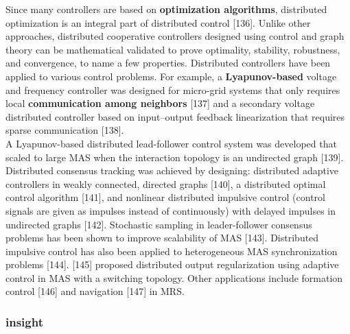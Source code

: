 \documentclass{article}
\begin{document}
				Since many controllers are based on \textbf{optimization algorithms}, distributed optimization is an integral part of distributed control \citet{rizk-2018-decision-making-in-multiagent-systems-a-survey}[136]. Unlike other approaches, distributed cooperative controllers designed using control and graph theory can be mathematical validated to prove optimality, stability, robustness, and convergence, to name a few properties. Distributed controllers have been applied to various control problems. For example, a \textbf{Lyapunov-based} voltage and frequency controller was designed for micro-grid systems that only  requires local \textbf{communication among neighbors} \citet{rizk-2018-decision-making-in-multiagent-systems-a-survey}[137] and a secondary voltage distributed controller based on input–output feedback linearization that requires sparse communication \citet{rizk-2018-decision-making-in-multiagent-systems-a-survey}[138]. 
				\\
				A Lyapunov-based distributed lead-follower control system was developed that scaled to large MAS when the interaction topology is an undirected graph  \citet{rizk-2018-decision-making-in-multiagent-systems-a-survey}[139]. Distributed consensus tracking was achieved by designing: distributed adaptive controllers in weakly connected, directed graphs \citet{rizk-2018-decision-making-in-multiagent-systems-a-survey}[140], a distributed optimal control algorithm \citet{rizk-2018-decision-making-in-multiagent-systems-a-survey}[141], and nonlinear distributed impulsive control (control signals are given as impulses instead of continuously) with delayed impulses in undirected graphs \citet{rizk-2018-decision-making-in-multiagent-systems-a-survey}[142]. Stochastic sampling in  leader-follower consensus problems has been shown to improve scalability of MAS \citet{rizk-2018-decision-making-in-multiagent-systems-a-survey}[143]. Distributed impulsive control has also been applied to heterogeneous MAS synchronization problems \citet{rizk-2018-decision-making-in-multiagent-systems-a-survey}[144]. \citet{rizk-2018-decision-making-in-multiagent-systems-a-survey}[145] proposed distributed output regularization using adaptive control in MAS with a switching topology. Other applications include formation control \citet{rizk-2018-decision-making-in-multiagent-systems-a-survey}[146] and navigation \citet{rizk-2018-decision-making-in-multiagent-systems-a-survey}[147] in MRS.
					
				\subsubsection{insight}
\end{document}
